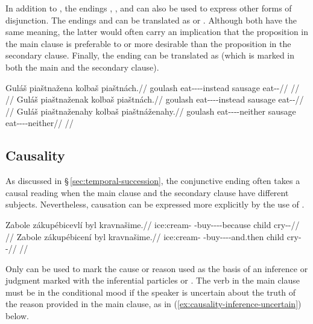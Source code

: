 In addition to , the endings , , and  can
also be used to express other forms of disjunction. The endings  and
 can be translated as  or .
Although both have the same meaning, the latter would often carry an implication
that the proposition in the main clause is preferable to or more desirable than
the proposition in the secondary clause. Finally, the ending  can be
translated as  (which is marked in both the main and the secondary
clause).

\pex
\a\begingl
  \gla Guláš piaštnažena kolbaš piaštnách.//
  \glb goulash eat-\Pv{}-\Ctp{}-\Cnj{}-instead sausage eat-\Pv{}-\Ctp{}//
  \glft {}//
\endgl
\a\begingl
  \glpreamble {}//
  \gla Guláš piaštnaženak kolbaš piaštnách.//
  \glb goulash eat-\Pv{}-\Ctp{}-\Cnj{}-instead sausage eat-\Pv{}-\Ctp{}//
  \glft {}//
\endgl
\a\begingl
  \gla Guláš piaštnaženahy kolbaš piaštnáženahy.//
  \glb goulash eat-\Pv{}-\Ctp{}-\Cnj{}-neither sausage eat-\Pv{}-\Ctp{}-\Cnj{}-neither//
  \glft {}//
\endgl
\xe

\subsection{Causality}
\label{sec:causality}

As discussed in \S\,\ref{sec:temporal-succession}, the conjunctive ending
 often takes a causal reading when the main clause and the secondary
clause have different subjects. Nevertheless, causation can be expressed more
explicitly by the use of .

\pex
\a\begingl
  \gla Zabole zákupébicevlí byl kravnašime.//
  \glb ice:cream-\Acc{} \Neg{}-buy-\Ben{}-\Pf{}-\Cnj{}-because child cry-\Av{}-\Prog{}//
  \glft {}//
\endgl
\a\begingl
  \gla Zabole zákupébicení byl kravnašime.//
  \glb ice:cream-\Acc{} \Neg{}-buy-\Ben{}-\Pf{}-\Cnj{}-and.then child cry-\Av{}-\Prog{}//
  \glft {}//
\endgl
\xe

Only  can be used to mark the cause or reason used as the basis of an
inference or judgment marked with the inferential particles  or
. The verb in the main clause must be in the conditional mood if the
speaker is uncertain about the truth of the reason provided in the main clause,
as in (\ref{ex:causality-inference-uncertain}) below.

